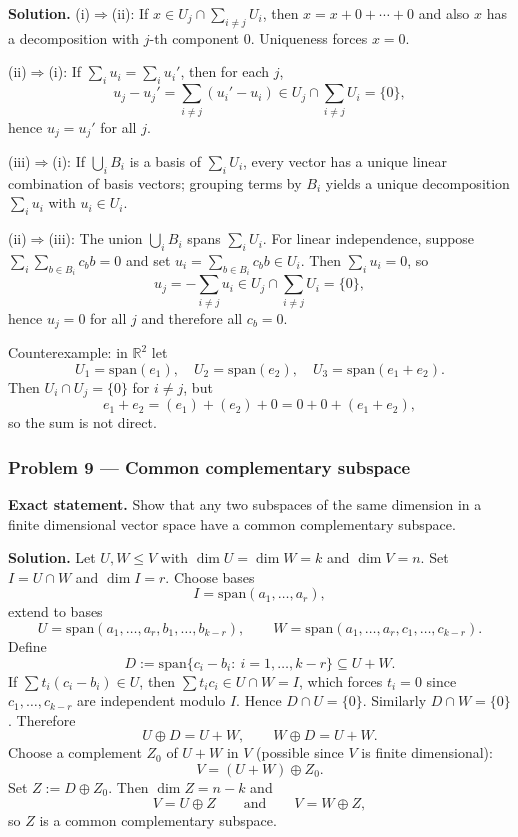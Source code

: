 \documentclass[12pt,a4paper]{article}
\theoremstyle{plain}
\theoremstyle{definition}      %
\begin{document}
\textbf{Solution.}
(i)$\Rightarrow$(ii): If $x\in U_j\cap\sum_{i\ne j}U_i$, then $x=x+0+\cdots+0$ and also $x$ has a decomposition with
$j$-th component $0$. Uniqueness forces $x=0$.

(ii)$\Rightarrow$(i): If $\sum_i u_i=\sum_i u_i'$, then for each $j$,
\[
u_j-u_j'=\sum_{i\ne j}(u_i'-u_i)\in U_j\cap\sum_{i\ne j}U_i=\{0\},
\]
hence $u_j=u_j'$ for all $j$.

(iii)$\Rightarrow$(i): If $\bigcup_i B_i$ is a basis of $\sum_i U_i$, every vector has a unique linear combination of basis
vectors; grouping terms by $B_i$ yields a unique decomposition $\sum_i u_i$ with $u_i\in U_i$.

(ii)$\Rightarrow$(iii): The union $\bigcup_i B_i$ spans $\sum_i U_i$. For linear independence, suppose
$\sum_i \sum_{b\in B_i} c_b b=0$ and set $u_i=\sum_{b\in B_i} c_b b\in U_i$. Then $\sum_i u_i=0$, so
\[
u_j=-\sum_{i\ne j}u_i\in U_j\cap\sum_{i\ne j}U_i=\{0\},
\]
hence $u_j=0$ for all $j$ and therefore all $c_b=0$.

Counterexample: in $\mathbb R^2$ let
\[
U_1=\mathrm{span}(e_1),\quad U_2=\mathrm{span}(e_2),\quad U_3=\mathrm{span}(e_1+e_2).
\]
Then $U_i\cap U_j=\{0\}$ for $i\ne j$, but
\[
e_1+e_2=(e_1)+(e_2)+0=0+0+(e_1+e_2),
\]
so the sum is not direct.

\bigskip

\subsubsection*{Problem 9 — Common complementary subspace}

\textbf{Exact statement.}
Show that any two subspaces of the same dimension in a finite dimensional vector space have a common complementary subspace.

\textbf{Solution.}
Let $U,W\le V$ with $\dim U=\dim W=k$ and $\dim V=n$. Set $I=U\cap W$ and $\dim I=r$.
Choose bases
\[
I=\mathrm{span}(a_1,\dots,a_r),
\]
extend to bases
\[
U=\mathrm{span}(a_1,\dots,a_r,b_1,\dots,b_{k-r}),\qquad
W=\mathrm{span}(a_1,\dots,a_r,c_1,\dots,c_{k-r}).
\]
Define
\[
D:=\mathrm{span}\{c_i-b_i:\ i=1,\dots,k-r\}\subseteq U+W.
\]
If $\sum t_i(c_i-b_i)\in U$, then $\sum t_i c_i\in U\cap W=I$, which forces $t_i=0$ since
$c_1,\dots,c_{k-r}$ are independent modulo $I$. Hence $D\cap U=\{0\}$. Similarly $D\cap W=\{0\}$.
Therefore
\[
U\oplus D=U+W,\qquad W\oplus D=U+W.
\]
Choose a complement $Z_0$ of $U+W$ in $V$ (possible since $V$ is finite dimensional):
\[
V=(U+W)\oplus Z_0.
\]
Set $Z:=D\oplus Z_0$. Then $\dim Z=n-k$ and
\[
V=U\oplus Z\qquad\text{and}\qquad V=W\oplus Z,
\]
so $Z$ is a common complementary subspace.
\end{document}
